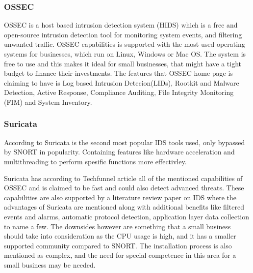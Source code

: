 
\subsubsection{OSSEC}
OSSEC is a host based intrusion detection system (HIDS) which is a free and open-source intrusion detection tool for monitoring system events, and filtering unwanted traffic. OSSEC capabilities is supported with the most used operating systems for businesses, which run on Linux, Windows or Mac OS. The system is free to use and this makes it ideal for small businesses, that might have a tight budget to finance their investments. The features that OSSEC home page \cite{SANS2011_RobertsonC} is claiming to have is Log based Intrusion Detecion(LIDs), Rootkit and Malware Detection, Active Response, Compliance Auditing, File Integrity Monitoring (FIM) and System Inventory.\\

\subsubsection{Suricata}

According to \cite{Reznik2021-mz} Suricata is the second most popular IDS tools used, only bypassed by SNORT in popularity. Containing features like hardware acceleration and multithreading to perform spesific functions more effectivley.

Suricata has according to Techfunnel article \cite{Techfunnel} all of the mentioned capabilities of OSSEC and is claimed to be fast and could also detect advanced threats. These capabilities are also supported by a literature review paper on IDS \cite{ozkan2021comprehensive} where the advantages of Suricata are mentioned along with additional benefits like filtered events and alarms, automatic protocol detection, application layer data collection to name a few. The downsides however are something that a small business should take into consideration as the CPU usage is high, and it has a smaller supported community compared to SNORT. The installation process is also mentioned as complex, and the need for special competence in this area for a small business may be needed.\\
